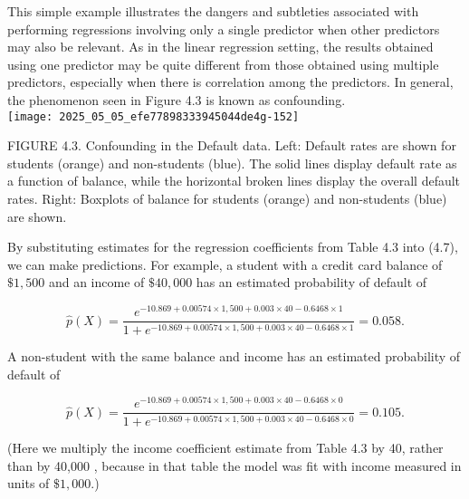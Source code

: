 \documentclass[10pt]{article}
\begin{document}
This simple example illustrates the dangers and subtleties associated with performing regressions involving only a single predictor when other predictors may also be relevant. As in the linear regression setting, the results obtained using one predictor may be quite different from those obtained using multiple predictors, especially when there is correlation among the predictors. In general, the phenomenon seen in Figure 4.3 is known as confounding.\\
\texttt{[image: 2025\_05\_05\_efe77898333945044de4g-152]}

FIGURE 4.3. Confounding in the Default data. Left: Default rates are shown for students (orange) and non-students (blue). The solid lines display default rate as a function of balance, while the horizontal broken lines display the overall default rates. Right: Boxplots of balance for students (orange) and non-students (blue) are shown.

By substituting estimates for the regression coefficients from Table 4.3 into (4.7), we can make predictions. For example, a student with a credit card balance of $\$ 1,500$ and an income of $\$ 40,000$ has an estimated probability of default of


\begin{equation*}
\hat{p}(X)=\frac{e^{-10.869+0.00574 \times 1,500+0.003 \times 40-0.6468 \times 1}}{1+e^{-10.869+0.00574 \times 1,500+0.003 \times 40-0.6468 \times 1}}=0.058 . \tag{4.8}
\end{equation*}


A non-student with the same balance and income has an estimated probability of default of


\begin{equation*}
\hat{p}(X)=\frac{e^{-10.869+0.00574 \times 1,500+0.003 \times 40-0.6468 \times 0}}{1+e^{-10.869+0.00574 \times 1,500+0.003 \times 40-0.6468 \times 0}}=0.105 . \tag{4.9}
\end{equation*}


(Here we multiply the income coefficient estimate from Table 4.3 by 40, rather than by 40,000 , because in that table the model was fit with income measured in units of $\$ 1,000$.)
\end{document}
